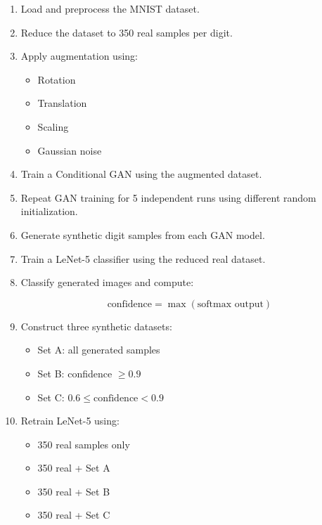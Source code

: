 \begin{enumerate}

    \item Load and preprocess the MNIST dataset.
    
    \item Reduce the dataset to 350 real samples per digit.
    
    \item Apply augmentation using:
    
    \begin{itemize}
        \item Rotation
        \item Translation
        \item Scaling
        \item Gaussian noise
    \end{itemize}
    
    \item Train a Conditional GAN using the augmented dataset.
    
    \item Repeat GAN training for 5 independent runs using different random initialization.
    
    \item Generate synthetic digit samples from each GAN model.
    
    \item Train a LeNet-5 classifier using the reduced real dataset.
    
    \item Classify generated images and compute:
    
    \[
    \text{confidence} = \max(\text{softmax output})
    \]
    
    \item Construct three synthetic datasets:
    
    \begin{itemize}
        \item Set A: all generated samples
        \item Set B: confidence $\geq 0.9$
        \item Set C: $0.6 \leq \text{confidence} < 0.9$
    \end{itemize}
    
    \item Retrain LeNet-5 using:
    
    \begin{itemize}
        \item 350 real samples only
        \item 350 real + Set A
        \item 350 real + Set B
        \item 350 real + Set C
    \end{itemize}
    

\end{enumerate}
